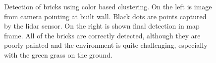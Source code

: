 \begin{figure}[H]
	\caption[Colored pointcloud detections]{Detection of bricks using color based clustering. On the left is image from camera pointing at built wall. Black dots are points captured by the lidar sensor. On the right is shown final detection in map frame. All of the bricks are correctly detected, although they are poorly painted and the environment is quite challenging, especially with the green grass on the ground.}
	\label{fig:colors}
\end{figure}

\newpage
